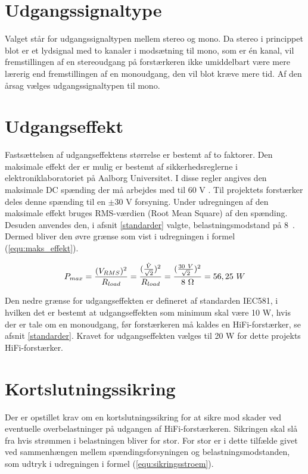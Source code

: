 \section{Udgangssignaltype}
\label{valg_udgangssignaltype}
Valget står for udgangssignaltypen mellem stereo og mono. Da stereo i princippet blot er et lydsignal med to kanaler i modsætning til mono, som er én kanal, vil fremstillingen af en stereoudgang på forstærkeren ikke umiddelbart være mere lærerig end fremstillingen af en monoudgang, den vil blot kræve mere tid. Af den årsag vælges udgangssignaltypen til mono.

\section{Udgangseffekt}
\label{valg_udgangseffekt}
Fastsættelsen af udgangseffektens størrelse er bestemt af to faktorer. Den maksimale effekt der er mulig er bestemt af sikkerhedsreglerne i elektroniklaboratoriet på Aalborg Universitet. I disse regler angives den maksimale DC spænding der må arbejdes med til 60 V \cite{elregler-b1101}. 
Til projektets forstærker deles denne spænding til en $\pm$30 V forsyning. Under udregningen af den maksimale effekt bruges RMS-værdien (Root Mean Square) af den spænding. Desuden anvendes den, i afsnit \ref{standarder} valgte, belastningsmodstand på 8~\ohm. Dermed bliver den øvre grænse som vist i udregningen i formel (\ref{equ:maks_effekt}).

\begin{equation}
\label{equ:maks_effekt}
P_{max} = \frac{(V_{RMS})^2}{R_{load}}= \frac{(\frac{\hat{V}}{\sqrt{2}})^2}{R_{load}} = \frac{(\frac{30~V}{\sqrt{2}})^2}{8~\ohm} = 56,25~W
\end{equation}

Den nedre grænse for udgangseffekten er defineret af standarden IEC581, i hvilken det er bestemt at udgangseffekten som minimum skal være 10 W, hvis der er tale om en monoudgang, før forstærkeren må kaldes en HiFi-forstærker, se afsnit \ref{standarder}. Kravet for udgangseffekten vælges til 20 W for dette projekts HiFi-forstærker.

\section{Kortslutningssikring}
\label{valg_kortslutningssikring}
Der er opstillet krav om en kortslutningssikring for at sikre mod skader ved eventuelle overbelastninger på udgangen af HiFi-forstærkeren. Sikringen skal slå fra hvis strømmen i belastningen bliver for stor. For stor er i dette tilfælde givet ved sammenhængen mellem spændingsforsyningen og belastningsmodstanden, som udtryk i udregningen i formel (\ref{equ:sikringsstroem}).

